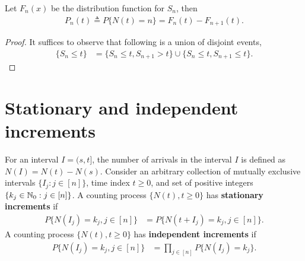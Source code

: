 \documentclass[a4paper,10pt,english]{article}
\begin{document}
\begin{lem}
Let $F_n(x)$ be the distribution function for $S_n$, then 
\begin{align*}
P_n(t) \triangleq P\{N(t) = n\} = F_{n}(t)-F_{n+1}(t).
\end{align*}
\end{lem}
\begin{proof} It suffices to observe that following is a union of disjoint events,
\begin{align*}
\{S_n \leqslant t \} &= \{S_n \leqslant t, S_{n+1} > t\} \cup \{S_{n} \leqslant t, S_{n+1} \leqslant t\}.
\end{align*}
\end{proof}

\section{Stationary and independent increments}
For an interval $I = (s,t]$, the number of arrivals in the interval $I$ is defined as $N(I) = N(t) - N(s)$. 
Consider an arbitrary collection of mutually exclusive intervals $\{I_j: j \in [n]\}$, time index $t \geqslant 0$, and set of positive integers $\{k_j \in \mathbb{N}_0 : j \in [n]\}$. 
A counting process $\{N(t), t\geqslant 0\}$ has \textbf{stationary increments} if
\begin{align*}
P\{N(I_j) = k_j, j \in [n]\} &= P\{N(t + I_j) = k_j, j \in [n]\}.
\end{align*}
A counting process $\{N(t), t\geqslant 0\}$ has \textbf{independent increments} if %
\begin{align*}
P\{N(I_j) = k_j, j \in [n]\} &= \prod_{j \in [n]}P\{N(I_j) = k_j\}.
\end{align*}
\end{document}
